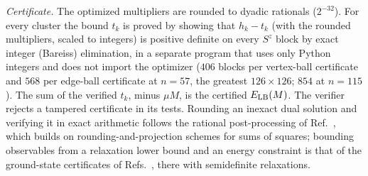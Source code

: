 \documentclass[aps,prx,onecolumn,10pt,nofootinbib,longbibliography,floatfix]{revtex4-2}
\theoremstyle{remark}
\begin{document}
\emph{Certificate.} The optimized multipliers are rounded to dyadic rationals ($2^{-32}$). For every cluster the bound %
$t_k$ is proved by showing that $h_k-t_k$ (with the rounded multipliers, scaled to integers) is positive definite on
every $S^z$ block by exact integer (Bareiss) elimination, in a separate program that uses only Python integers and does
not import the optimizer ($406$ blocks per vertex-ball certificate and $568$ per edge-ball certificate at $n=57$, the %
greatest $126\times126$; $854$ at $n=115$). The sum of the verified %
$t_k$, minus $\mu M$, is the certified $E_{\rm LB}(M)$. The verifier rejects a tampered certificate in its tests. Rounding an
inexact dual solution and verifying it in exact arithmetic follows the rational post-processing of Ref.~\cite{naceur2025}, which builds on rounding-and-projection schemes for sums of squares; bounding observables %
from a relaxation lower bound and an energy constraint is that of the ground-state certificates of
Refs.~\cite{wang2024prx,wang2026scipost}, there with semidefinite relaxations. %
\end{document}
